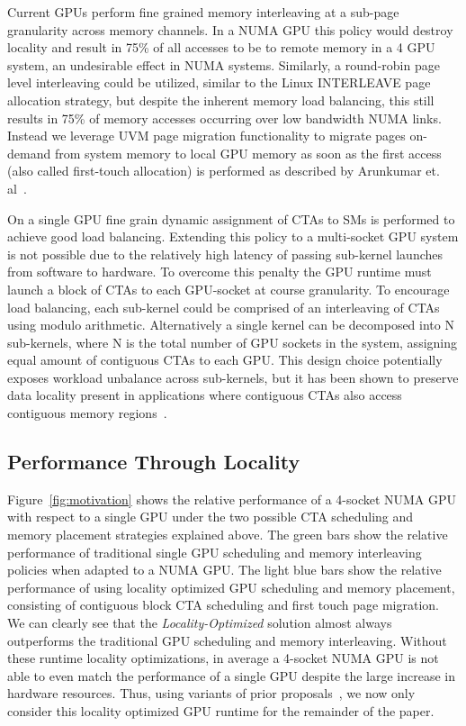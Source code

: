 Current GPUs perform fine grained memory interleaving at a sub-page granularity 
across memory channels.  In a NUMA GPU this policy would destroy locality and 
result in 75\% of all accesses to be to remote memory in a 4 GPU system, an 
undesirable effect in NUMA systems.  Similarly, a round-robin page level 
interleaving could be utilized, similar to the Linux INTERLEAVE page allocation 
strategy, but despite the inherent memory load balancing, this still results in 
75\% of memory accesses occurring over low bandwidth NUMA links. Instead we 
leverage UVM page migration functionality to migrate pages on-demand from system 
memory to local GPU memory as soon as the first access (also called first-touch 
allocation) is performed as described by Arunkumar et. al~\cite{Arunkumar2017}.

On a single GPU fine grain dynamic assignment of CTAs to SMs is performed to 
achieve good load balancing.  Extending this policy to a multi-socket GPU 
system is not possible due to the relatively high latency of passing sub-kernel 
launches from software to hardware.  To overcome this penalty the GPU runtime 
must launch a block of CTAs to each GPU-socket at course granularity.  To 
encourage load balancing, each sub-kernel could be comprised of an interleaving 
of CTAs using modulo arithmetic.  Alternatively a single kernel can be 
decomposed into N sub-kernels, where N is the total number of GPU sockets in 
the system, assigning equal amount of contiguous CTAs to each GPU.  This design 
choice potentially exposes workload unbalance across sub-kernels, but it has 
been shown to preserve data locality present in applications where contiguous 
CTAs also access contiguous memory regions~\cite{Cabezas2015,Arunkumar2017}.

\subsection{Performance Through Locality} 

Figure~\ref{fig:motivation} shows the relative performance of a 4-socket NUMA 
GPU with respect to a single GPU under the two possible CTA scheduling and 
memory placement strategies explained above.  The green bars show the 
relative performance of traditional single GPU scheduling and memory 
interleaving policies when adapted to a NUMA GPU. The light blue bars
show the relative performance of using locality optimized GPU scheduling and 
memory placement, consisting of contiguous block CTA scheduling and first touch 
page migration. We can clearly see that the \textit{Locality-Optimized} 
solution almost always outperforms the traditional GPU scheduling and memory 
interleaving.  Without these runtime locality optimizations, in average a 4-socket NUMA 
GPU is not able to even match the performance of a single GPU despite the large 
increase in hardware resources.  Thus, using variants of prior 
proposals~\cite{Cabezas2015,Arunkumar2017}, we now only consider this locality 
optimized GPU runtime for the remainder of the paper.

